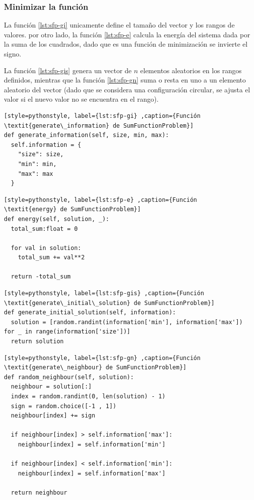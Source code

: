 \documentclass[12pt,twoside]{article}
\begin{document}
	\subsubsection{Minimizar la función}

La función \ref{lst:sfp-gi} unicamente define el tamaño del vector y los rangos de valores. por otro lado, la función \ref{lst:sfp-e} calcula la energía del sistema dada por la suma de los cuadrados, dado que es una función de minimización se invierte el signo.

La función \ref{lst:sfp-gis} genera un vector de $n$ elementos aleatorios en los rangos definidos, mientras que la función \ref{lst:sfp-gn} suma  o resta en uno a un elemento aleatorio del vector (dado que se considera una configuración circular, se ajusta el valor si el nuevo valor no se encuentra en el rango).

\begin{lstlisting}[style=pythonstyle, label={lst:sfp-gi} ,caption={Función \textit{generate\_information} de SumFunctionProblem}]
def generate_information(self, size, min, max):
  self.information = {
	"size": size,
	"min": min,
	"max": max
  }
\end{lstlisting}

\begin{lstlisting}[style=pythonstyle, label={lst:sfp-e} ,caption={Función \textit{energy} de SumFunctionProblem}]
def energy(self, solution, _):
  total_sum:float = 0

  for val in solution:
    total_sum += val**2

  return -total_sum
\end{lstlisting}

\begin{lstlisting}[style=pythonstyle, label={lst:sfp-gis} ,caption={Función \textit{generate\_initial\_solution} de SumFunctionProblem}]
def generate_initial_solution(self, information):
  solution = [random.randint(information['min'], information['max']) for _ in range(information['size'])]
  return solution
\end{lstlisting}

\begin{lstlisting}[style=pythonstyle, label={lst:sfp-gn} ,caption={Función \textit{generate\_neighbour} de SumFunctionProblem}]
def random_neighbour(self, solution):
  neighbour = solution[:]
  index = random.randint(0, len(solution) - 1)
  sign = random.choice([-1 , 1])
  neighbour[index] += sign

  if neighbour[index] > self.information['max']:
	neighbour[index] = self.information['min']

  if neighbour[index] < self.information['min']:
	neighbour[index] = self.information['max']

  return neighbour
\end{lstlisting}

	\clearpage
	
	
	
\end{document}
